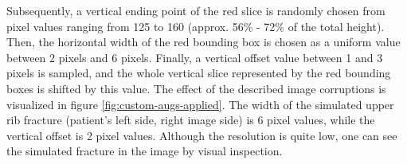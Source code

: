 Subsequently, a vertical ending point of the red slice is randomly chosen from pixel values ranging from 125 to 160 (approx. 56\% - 72\% of the total height).
Then, the horizontal width of the red bounding box is chosen as a uniform value between 2 pixels and 6 pixels.
Finally, a vertical offset value between 1 and 3 pixels is sampled, and the whole vertical slice represented by the red bounding boxes is shifted by this value.
The effect of the described image corruptions is visualized in figure \ref{fig:custom-augs-applied}.
The width of the simulated upper rib fracture (patient's left side, right image side) is 6 pixel values, while the vertical offset is 2 pixel values.
Although the resolution is quite low, one can see the simulated fracture in the image by visual inspection.
